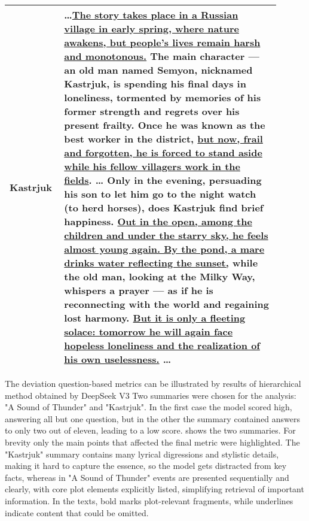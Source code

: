 \documentclass{superfri}
\begin{document}
{\begin{tabular}{|p{0.15\linewidth}|p{0.75\linewidth}|}
    \textbf{Kastrjuk} & \dots \uline{The story takes place in a Russian village in early spring, 
    where nature awakens, but people’s lives remain harsh and monotonous.} \textbf{The main character — an old man named Semyon, nicknamed Kastrjuk}, 
    is spending his final days in loneliness, \textbf{tormented by memories of his former strength} and regrets over his present frailty. \textbf{Once he was known as the best worker in the district}, 
    \uline{but now, frail and forgotten, he is forced to stand aside while his fellow villagers work in the fields}. \dots
    \textbf{Only in the evening, persuading his son to let him go to the night watch (to herd horses), does Kastrjuk find brief happiness}. \uline{Out in the open, among the children and under the starry sky, he feels almost young again. 
    By the pond, a mare drinks water reflecting the sunset,} while the \textbf{old man, looking at the Milky Way, whispers a prayer — as if he is reconnecting with the world and regaining lost harmony}. 
    \uline{But it is only a fleeting solace: tomorrow he will again face hopeless loneliness and the realization of his own uselessness.} \dots
    \\ \hline

  \end{tabular}
}

The deviation question-based metrics can be illustrated by results of hierarchical method obtained by DeepSeek V3
Two summaries were chosen for the analysis: "A Sound of Thunder" and "Kastrjuk".
In the first case the model scored high, answering all but one question, but in the other the summary contained answers to only two out of eleven, leading to a low score. 
 shows the two summaries. For brevity only the main points that affected the final metric were highlighted.
The "Kastrjuk" summary contains many lyrical digressions and stylistic details, making it hard to capture the essence, so the model gets distracted from key facts, 
whereas in "A Sound of Thunder" events are presented sequentially and clearly, with core plot elements explicitly listed, simplifying retrieval of important information.
In the texts, bold marks plot-relevant fragments, while underlines indicate content that could be omitted.
\end{document}
